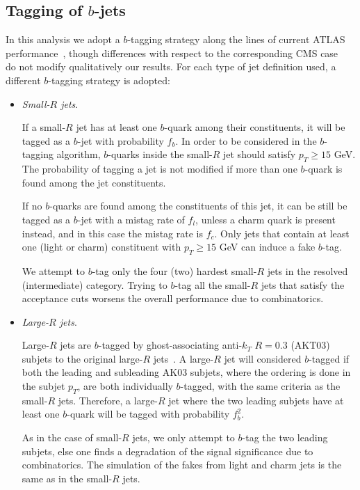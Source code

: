 \subsection{Tagging of $b$-jets}
\label{sec:btagging}

In this analysis we adopt
a $b$-tagging strategy along the lines
of current ATLAS performance~\cite{Aad:2013gja,Aad:2015ydr},
though differences with respect to
the corresponding CMS case~\cite{Khachatryan:2011wq,Chatrchyan:2012jua}
do not modify qualitatively our results.
%
For each type of jet definition used, a different
$b$-tagging strategy is adopted:

\begin{itemize}

\item {\it Small-$R$ jets}.

  If a small-$R$ jet has at least one $b$-quark among their constituents,
  it will be tagged as a $b$-jet with probability $f_b$.
  In order to be considered in the $b$-tagging algorithm,
  $b$-quarks inside the small-$R$ jet
  should satisfy $p_T \ge 15$ GeV.
  The probability of tagging a jet is not modified
  if more than one $b$-quark is found among the jet constituents.


  
  If no $b$-quarks are found among the constituents
  of this jet, it can be still be tagged as a $b$-jet with
  a mistag rate of $f_l$, unless a charm quark is present instead,
  and in this case the mistag rate is $f_c$.
  Only jets that contain at least one (light or charm)
  constituent
  with $p_T \ge 15$ GeV can induce a fake $b$-tag.

  
  We attempt to $b$-tag only the four (two) hardest small-$R$ jets
  in the resolved (intermediate) category.
  Trying to $b$-tag all the
  small-$R$ jets that satisfy the acceptance cuts worsens the
  overall performance
  due to combinatorics.

  \item {\it Large-$R$ jets}.

    Large-$R$ jets are $b$-tagged by
    ghost-associating anti-$k_T$ $R=0.3$ (AKT03)
    subjets to the original large-$R$
    jets~\cite{Cacciari:2007fd,Aad:2013gja,
      ATLAS-CONF-2014-004,Aad:2015uka}.
    A large-$R$ jet will considered $b$-tagged if both
    the leading and subleading AK03 subjets, where the ordering
    is done in the subjet $p_T$, are both individually $b$-tagged,
    with the same criteria as the small-$R$ jets.
     Therefore, a large-$R$ jet where the two leading
    subjets have at least one $b$-quark will be tagged
    with probability $f_b^2$.
    
    As in the case
    of small-$R$ jets, we only attempt to $b$-tag the two leading subjets,
    else one finds a degradation of the
    signal significance due to combinatorics.
    The simulation of the fakes from light and charm jets
    is the same as in the small-$R$ jets.
  


\end{itemize}

